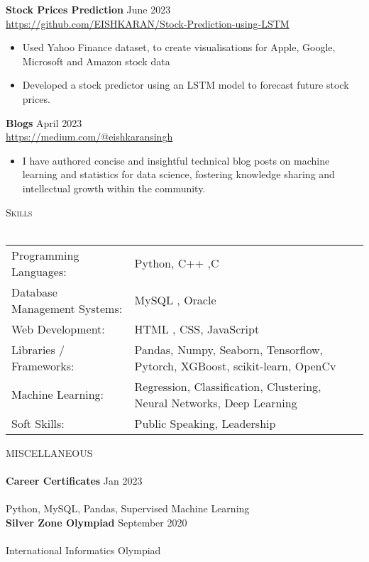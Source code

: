 \documentclass[a4paper]{article}
\newcommand{\lineunder} {
    \vspace*{-8pt} \\
    \hspace*{-18pt} \hrulefill \\
}
\newcommand{\header} [1] {
    {\hspace*{-18pt}\vspace*{6pt} \textsc{#1}}
    \vspace*{-6pt} \lineunder
}
\begin{document}
{\textbf{Stock Prices Prediction}} \hfill June 2023 \\
\vspace{0.5mm}
\url{https://github.com/EISHKARAN/Stock-Prediction-using-LSTM} \\
\vspace{-2mm}
\begin{itemize} 
	\item Used Yahoo Finance dataset, to create visualisations for Apple, Google, Microsoft and Amazon stock data
    \vspace{-2mm}
    \item Developed a stock predictor using an LSTM model to forecast future stock prices.
\end{itemize}
{\textbf{Blogs }} \hfill April 2023\\
\vspace{-1mm}
\url{https://medium.com/@eishkaransingh} \\
\vspace{-2mm}
\begin{itemize} 
    \item I have authored concise and insightful technical blog posts on machine learning and statistics for data science, fostering knowledge sharing and intellectual growth within the community.
\end{itemize}
\header{Skills}
\vspace{2mm}
\begin{tabular}{ l l }
	Programming Languages: & Python, C++ ,C  \\
	\vspace{1mm}
	Database Management Systems: & MySQL , Oracle \\ 
	Web Development:       & HTML , CSS, JavaScript   \\
	Libraries / Frameworks: & Pandas, Numpy, Seaborn, Tensorflow, Pytorch, XGBoost, scikit-learn, OpenCv        \\
	Machine Learning:             & Regression, Classification, Clustering, Neural Networks, Deep Learning\\
	Soft Skills:           &  Public Speaking, Leadership  \\
	
\end{tabular}


\vspace{2mm}
\header{MISCELLANEOUS}
{\textbf{Career Certificates }} \hfill Jan 2023\\  \\Python, MySQL, Pandas, Supervised Machine Learning\\ 
{\textbf{Silver Zone Olympiad }} \hfill September 2020\\  \\International Informatics Olympiad\\ 
\end{document}
